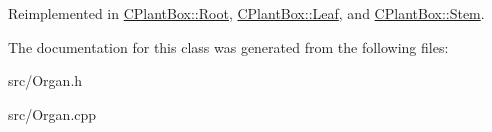 Reimplemented in \hyperlink{classCPlantBox_1_1Root_accf492ad0fa522fccc43588d1cde4610}{C\+Plant\+Box\+::\+Root}, \hyperlink{classCPlantBox_1_1Leaf_a0b5fbb524de825790da55551a212d4a0}{C\+Plant\+Box\+::\+Leaf}, and \hyperlink{classCPlantBox_1_1Stem_ae4087e7edf3b51619d6e8fd03a3c9ec8}{C\+Plant\+Box\+::\+Stem}.



The documentation for this class was generated from the following files\+:\begin{DoxyCompactItemize}
\item 
src/Organ.\+h\item 
src/Organ.\+cpp\end{DoxyCompactItemize}
